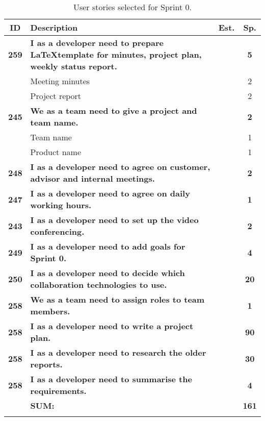 \begin{longtable}{cp{8cm}cc} 
\toprule[1mm]
\textbf{ID} 	& \textbf{Description} 									& \textbf{Est.} & \textbf{Sp.} \\
\hline
\textbf{259} 	& {\bf I as a developer need to prepare \LaTeX template for minutes, project plan, weekly status report.} 	& 			& \textbf{5} \\
				& Meeting minutes	&  & 2 \\
				& Project report 	&  & 2 \\

\textbf{245} 	& \textbf{We as a team need to give a project and team name.} 						& 			& \textbf{2} \\
				& Team name &  & 1 \\
				& Product name &  & 1 \\

\textbf{248} 	& \textbf{I as a developer need to agree on customer, advisor and internal meetings.} 						& 			& \textbf{2} \\

\textbf{247} 	& \textbf{I as a developer need to agree on daily working hours.} 						&  			& \textbf{1} \\

\textbf{243} 	& \textbf{I as a developer need to set up the video conferencing.} 						& 			& \textbf{2} \\

\textbf{249} 	& \textbf{I as a developer need to add goals for Sprint 0.} 						& 			& \textbf{4} \\

\textbf{250} 	& \textbf{I as a developer need to decide which collaboration technologies to use.} 						& 			& \textbf{20} \\

\textbf{258} 	& \textbf{We as a team need to assign roles to team members.} 						& 			& \textbf{1} \\

\textbf{258} 	& \textbf{I as a developer need to write a project plan.} 						&  			& \textbf{90} \\

\textbf{258} 	& \textbf{I as a developer need to research the older reports.} 						&  			& \textbf{30} \\

\textbf{258} 	& \textbf{I as a developer need to summarise the requirements.} 						&  			& \textbf{4} \\
\hline
				& \textbf{SUM:}		&			& \textbf{161}
 \\																			
\bottomrule[1mm]
\caption{User stories selected for Sprint 0. }
\label{tab:sprint0stories}
\end{longtable}

